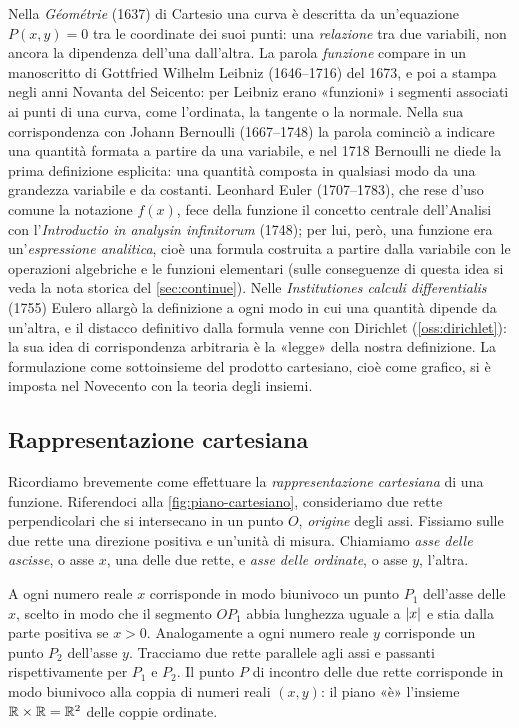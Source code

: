 \begin{notastorica}
Nella \emph{Géométrie} (1637) di Cartesio una curva è descritta da un'equazione
$P(x,y)=0$ tra le coordinate dei suoi punti: una \emph{relazione} tra due variabili, non
ancora la dipendenza dell'una dall'altra. La parola \emph{funzione} compare in un
manoscritto di Gottfried Wilhelm Leibniz (1646--1716) del 1673, e poi a stampa negli
anni Novanta del Seicento: per Leibniz erano «funzioni» i segmenti associati ai punti di
una curva, come l'ordinata, la tangente o la normale. Nella sua corrispondenza con
Johann Bernoulli (1667--1748) la parola cominciò a indicare una quantità formata a
partire da una variabile, e nel 1718 Bernoulli ne diede la prima definizione esplicita:
una quantità composta in qualsiasi modo da una grandezza variabile e da costanti.
Leonhard Euler (1707--1783), che rese d'uso comune la notazione $f(x)$, fece della
funzione il concetto centrale dell'Analisi con l'\emph{Introductio in analysin
infinitorum} (1748); per lui, però, una funzione era un'\emph{espressione analitica},
cioè una formula costruita a partire dalla variabile con le operazioni algebriche e le
funzioni elementari (sulle conseguenze di questa idea si veda la nota storica del
\cref{sec:continue}). Nelle \emph{Institutiones calculi differentialis} (1755) Eulero
allargò la definizione a ogni modo in cui una quantità dipende da un'altra, e il distacco
definitivo dalla formula venne con Dirichlet (\cref{oss:dirichlet}): la sua idea di
corrispondenza arbitraria è la «legge» della nostra definizione. La formulazione come
sottoinsieme del prodotto cartesiano, cioè come grafico, si è imposta nel Novecento con
la teoria degli insiemi.
\end{notastorica}

\subsection{Rappresentazione cartesiana}

Ricordiamo brevemente come effettuare la \emph{rappresentazione cartesiana}
di una funzione. Riferendoci alla \cref{fig:piano-cartesiano}, consideriamo due rette
perpendicolari che si intersecano in un punto $O$, \emph{origine} degli assi. Fissiamo
sulle due rette una direzione positiva e un'unità di misura. Chiamiamo \emph{asse delle
ascisse}, o asse $x$, una delle due rette, e \emph{asse delle ordinate}, o asse $y$,
l'altra.

A ogni numero reale $x$ corrisponde in modo biunivoco un punto $P_{1}$ dell'asse delle
$x$, scelto in modo che il segmento $OP_{1}$ abbia lunghezza uguale a $\lvert x\rvert$ e stia
dalla parte positiva se $x>0$. Analogamente a ogni numero reale $y$ corrisponde un
punto $P_{2}$ dell'asse $y$. Tracciamo due rette parallele agli assi e passanti
rispettivamente per $P_{1}$ e $P_{2}$. Il punto $P$ di incontro delle due rette
corrisponde in modo biunivoco alla coppia di numeri reali $(x,y)$: il piano «è»
l'insieme $\mathbb{R}\times\mathbb{R}=\mathbb{R}^{2}$ delle coppie ordinate.


